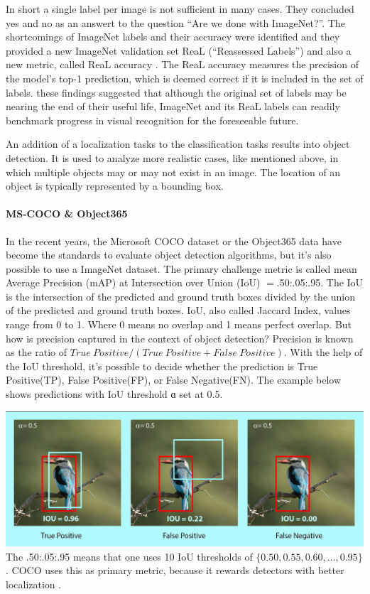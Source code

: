 \documentclass[
]{krantz}
\begin{document}
In short a single label per image is not sufficient in many cases. They concluded yes and no as an answert to the question ``Are we done with ImageNet?''. The shortcomings of ImageNet labels and their accuracy were identified and they provided a new ImageNet validation set ReaL \citep{beyer2020we} (``Reassessed Labels'') and also a new metric, called ReaL accuracy \citep{beyer2020we}. The ReaL accuracy measures the precision of the model's top-1 prediction, which is deemed correct if it is included in the set of labels. these findings suggested that although the original set of labels may be nearing the end of their useful life, ImageNet and its ReaL labels can readily benchmark progress in visual recognition for the foreseeable future.

An addition of a localization tasks to the classification tasks results into object detection. It is used to analyze more realistic cases, like mentioned above, in which multiple objects may or may not exist in an image. The location of an object is typically represented by a bounding box.

\hypertarget{ms-coco-object365}{%
\paragraph{MS-COCO \& Object365}\label{ms-coco-object365}}

In the recent years, the Microsoft COCO dataset or the Object365 data have become the standards to evaluate object detection algorithms, but it's also possible to use a ImageNet dataset. The primary challenge metric is called mean Average Precision (mAP) at Intersection over Union (IoU) \(=\).50:.05:.95. The IoU is the intersection of the predicted and ground truth boxes divided by the union of the predicted and ground truth boxes. IoU, also called Jaccard Index, values range from 0 to 1. Where 0 means no overlap and 1 means perfect overlap. But how is precision captured in the context of object detection? Precision is known as the ratio of \(True~Positive/(True~Positive+False~Positive)\). With the help of the IoU threshold, it's possible to decide whether the prediction is True Positive(TP), False Positive(FP), or False Negative(FN). The example below shows predictions with IoU threshold ɑ set at 0.5.

\includegraphics{figures/01-chapter1/4-birds-prediction-types-1.png}
The .50:.05:.95 means that one uses 10 IoU thresholds of \(\{0.50, 0.55, 0.60, \dots ,0.95\}\). COCO uses this as primary metric, because it rewards detectors with better localization \citep{coco_eval}.
\end{document}

